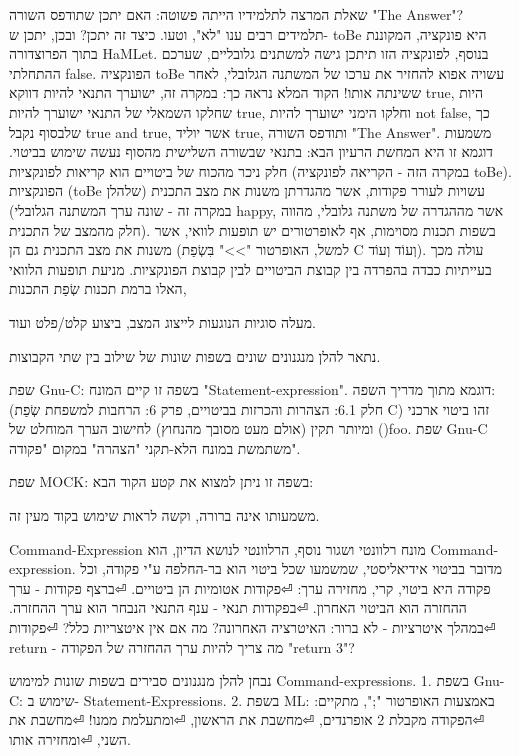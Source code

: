 \begin{טבלא}[!htbp]
        שאלת המרצה לתלמידיו הייתה פשוטה: האם יתכן שתודפס השורה "The Answer"? תלמידים
        רבים ענו "לא", וטעו. כיצד זה יתכן? ובכן, יתכן ש- toBe היא פונקציה, המקוננת בתוך
        הפרוצדורה HaMLet. בנוסף, לפונקציה הזו תיתכן גישה למשתנים גלובליים, שערכם
        ההתחלתי false. הפונקציה toBe עשויה אפוא להחזיר את ערכו של המשתנה הגלובלי, לאחר
        ששינתה אותו! הקוד המלא נראה כך: במקרה זה, ישוערך התנאי להיות דווקא true, היות
        שחלקו השמאלי של התנאי ישוערך להיות true, וחלקו הימני ישוערך להיות not false, כך
        שלבסוף נקבל true and true, אשר יוליד true, ותודפס השורה "The Answer".
        משמעות דוגמא זו היא המחשת הרעיון הבא:
        בתנאי שבשורה השלישית מהסוף נעשה שימוש בביטוי. חלק ניכר מהכוח של ביטויים הוא קריאות לפונקציות (במקרה הזה - הקריאה לפונקציה toBe). הפונקציות (toBe שלהלן) עשויות לעורר פקודות, אשר מהגדרתן משנות את מצב התכנית (במקרה זה - שונה ערך המשתנה הגלובלי happy, אשר מההגדרה של משתנה גלובלי, מהווה חלק מהמצב של התכנית). בשפות תכנות מסוימות, אף לאופרטורים יש תופעות לוואי, אשר משנות את מצב התכנית גם הן (למשל, האופרטור ">>" בִּשְׂפַת C וְעוֹד וְעוֹד). עולה מכך בעייתיות כבדה בהפרדה בין קבוצת הביטויים לבין קבוצת הפונקציות. מניעת תופעות הלוואי האלו ברמת תכנות שְׂפַת התכנות,

        מעלה סוגיות הנוגעות לייצוג המצב, ביצוע קלט/פלט ועוד.

        נתאר להלן מנגנונים שונים בשפות שונות של שילוב בין שתי הקבוצות.

        שפת Gnu-C:
        בשפה זו קיים המונח "Statement-expression".
        דוגמא מתוך מדריך השפה: (חלק 6.1: הצהרות והכרזות בביטויים, פרק 6: הרחבות למשפחת שְׂפַת C)
        זהו ביטוי ארכני ומיותר תקין (אולם מעט מסובך מהנחוץ) לחישוב הערך המוחלט של ()foo.
        שפת Gnu-C משתמשת במונח הלא-תקני "הצהרה" במקום "פקודה".

        שפת MOCK:
        בשפה זו ניתן למצוא את קטע הקוד הבא:

        משמעותו אינה ברורה, וקשה לראות שימוש בקוד מעין זה.

        Command-Expression
        מונח רלוונטי ושגור נוסף, הרלוונטי לנושא הדיון, הוא Command-expression. מדובר בביטוי אידיאליסטי, שמשמעו שכל ביטוי הוא בר-החלפה ע"י פקודה, וכל פקודה היא ביטוי, קרי, מחזירה ערך:
⏎פקודות אטומיות הן ביטויים.
⏎ברצף פקודות - ערך ההחזרה הוא הביטוי האחרון.
⏎בפקודות תנאי - ענף התנאי הנבחר הוא ערך ההחזרה.
⏎במהלך איטרציות - לא ברור: האיטרציה האחרונה? מה אם אין איטצריות כלל?
⏎פקודות return - מה צריך להיות ערך ההחזרה של הפקודה "return 3"?

        נבחן להלן מנגנונים סבירים בשפות שונות למימוש Command-expressions.
        1. בשפת Gnu-C: שימוש ב- Statement-Expressions.
        2. בשפת ML: באמצעות האופרטור ";", מתקיים:
⏎הפקודה מקבלת 2 אופרנדים,
⏎מחשבת את הראשון,
⏎ומתעלמת ממנו!
⏎מחשבת את השני,
⏎ומחזירה אותו.


\end{טבלא}
